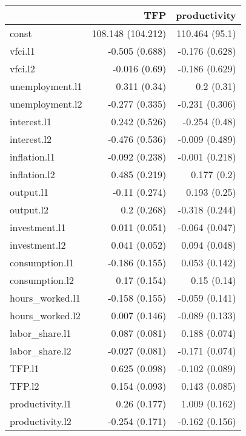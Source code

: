 \begin{longtable}{l|rr}
\toprule
\multicolumn{1}{l}{} & TFP & productivity \\ 
\midrule\addlinespace[2.5pt]
const & 108.148 (104.212) & 110.464 (95.1) \\ 
vfci.l1 & -0.505 (0.688) & -0.176 (0.628) \\ 
vfci.l2 & -0.016 (0.69) & -0.186 (0.629) \\ 
unemployment.l1 & 0.311 (0.34) & 0.2 (0.31) \\ 
unemployment.l2 & -0.277 (0.335) & -0.231 (0.306) \\ 
interest.l1 & 0.242 (0.526) & -0.254 (0.48) \\ 
interest.l2 & -0.476 (0.536) & -0.009 (0.489) \\ 
inflation.l1 & -0.092 (0.238) & -0.001 (0.218) \\ 
inflation.l2 & 0.485 (0.219) & 0.177 (0.2) \\ 
output.l1 & -0.11 (0.274) & 0.193 (0.25) \\ 
output.l2 & 0.2 (0.268) & -0.318 (0.244) \\ 
investment.l1 & 0.011 (0.051) & -0.064 (0.047) \\ 
investment.l2 & 0.041 (0.052) & 0.094 (0.048) \\ 
consumption.l1 & -0.186 (0.155) & 0.053 (0.142) \\ 
consumption.l2 & 0.17 (0.154) & 0.15 (0.14) \\ 
hours\_worked.l1 & -0.158 (0.155) & -0.059 (0.141) \\ 
hours\_worked.l2 & 0.007 (0.146) & -0.089 (0.133) \\ 
labor\_share.l1 & 0.087 (0.081) & 0.188 (0.074) \\ 
labor\_share.l2 & -0.027 (0.081) & -0.171 (0.074) \\ 
TFP.l1 & 0.625 (0.098) & -0.102 (0.089) \\ 
TFP.l2 & 0.154 (0.093) & 0.143 (0.085) \\ 
productivity.l1 & 0.26 (0.177) & 1.009 (0.162) \\ 
productivity.l2 & -0.254 (0.171) & -0.162 (0.156) \\ 
\bottomrule
\end{longtable}
